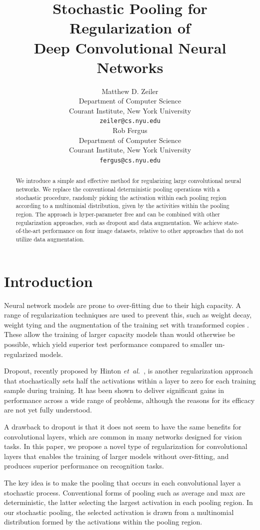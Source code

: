 \documentclass{article} %
\title{Stochastic Pooling for Regularization of \\ Deep Convolutional Neural Networks}
\author{
Matthew D. Zeiler \\
Department of Computer Science \\
Courant Institute, New York University \\
\texttt{zeiler@cs.nyu.edu} \\
\And
Rob Fergus \\
Department of Computer Science \\
Courant Institute, New York University \\
\texttt{fergus@cs.nyu.edu} \\
}
\def\etal{{\textit{et~al.~}}}
\begin{document}
\maketitle

\begin{abstract}
  We introduce a simple and effective method for regularizing large
  convolutional neural networks. We replace the conventional
  deterministic pooling operations with a stochastic procedure,
  randomly picking the activation within each pooling region according
  to a multinomial distribution, given by the activities within the
  pooling region. The approach is hyper-parameter free and can be
  combined with other regularization approaches, such as dropout and
  data augmentation. We achieve state-of-the-art performance on four
  image datasets, relative to other approaches that do not utilize
  data augmentation.
\end{abstract}

\section{Introduction}

Neural network models are prone to over-fitting due to their high
capacity. A range of regularization techniques are used to prevent
this, such as weight decay, weight tying and the augmentation of the
training set with transformed copies \cite{NNtricks}. These allow the
training of larger capacity models than would otherwise be possible,
which yield superior test performance compared to smaller un-regularized models.

Dropout, recently proposed by Hinton \etal \cite{Hinton12}, is another
regularization approach that stochastically sets half the activations
within a layer to zero for each training sample during training. It
has been shown to deliver significant gains in performance across a
wide range of problems, although the reasons for its efficacy are not
yet fully understood.

A drawback to dropout is that it does not seem to have the same
benefits for convolutional layers, which are common in many networks
designed for vision tasks.  In this paper, we propose a novel type of
regularization for convolutional layers that enables the training of
larger models without over-fitting, and produces superior performance
on recognition tasks.

The key idea is to make the pooling that occurs in each convolutional
layer a stochastic process. Conventional forms of pooling such as
average and max are deterministic, the latter selecting the largest
activation in each pooling region. In our stochastic pooling, the
selected activation is drawn from a multinomial distribution
formed by the activations within the pooling region.
\end{document}
